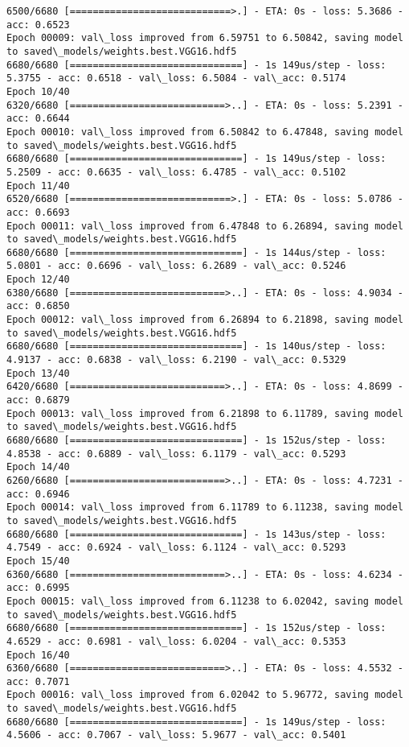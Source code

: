 \documentclass[11pt]{article}
\begin{document}
\begin{Verbatim}[commandchars=\\\{\}]
6500/6680 [============================>.] - ETA: 0s - loss: 5.3686 - acc: 0.6523
Epoch 00009: val\_loss improved from 6.59751 to 6.50842, saving model to saved\_models/weights.best.VGG16.hdf5
6680/6680 [==============================] - 1s 149us/step - loss: 5.3755 - acc: 0.6518 - val\_loss: 6.5084 - val\_acc: 0.5174
Epoch 10/40
6320/6680 [===========================>..] - ETA: 0s - loss: 5.2391 - acc: 0.6644
Epoch 00010: val\_loss improved from 6.50842 to 6.47848, saving model to saved\_models/weights.best.VGG16.hdf5
6680/6680 [==============================] - 1s 149us/step - loss: 5.2509 - acc: 0.6635 - val\_loss: 6.4785 - val\_acc: 0.5102
Epoch 11/40
6520/6680 [============================>.] - ETA: 0s - loss: 5.0786 - acc: 0.6693
Epoch 00011: val\_loss improved from 6.47848 to 6.26894, saving model to saved\_models/weights.best.VGG16.hdf5
6680/6680 [==============================] - 1s 144us/step - loss: 5.0801 - acc: 0.6696 - val\_loss: 6.2689 - val\_acc: 0.5246
Epoch 12/40
6380/6680 [===========================>..] - ETA: 0s - loss: 4.9034 - acc: 0.6850
Epoch 00012: val\_loss improved from 6.26894 to 6.21898, saving model to saved\_models/weights.best.VGG16.hdf5
6680/6680 [==============================] - 1s 140us/step - loss: 4.9137 - acc: 0.6838 - val\_loss: 6.2190 - val\_acc: 0.5329
Epoch 13/40
6420/6680 [===========================>..] - ETA: 0s - loss: 4.8699 - acc: 0.6879
Epoch 00013: val\_loss improved from 6.21898 to 6.11789, saving model to saved\_models/weights.best.VGG16.hdf5
6680/6680 [==============================] - 1s 152us/step - loss: 4.8538 - acc: 0.6889 - val\_loss: 6.1179 - val\_acc: 0.5293
Epoch 14/40
6260/6680 [===========================>..] - ETA: 0s - loss: 4.7231 - acc: 0.6946
Epoch 00014: val\_loss improved from 6.11789 to 6.11238, saving model to saved\_models/weights.best.VGG16.hdf5
6680/6680 [==============================] - 1s 143us/step - loss: 4.7549 - acc: 0.6924 - val\_loss: 6.1124 - val\_acc: 0.5293
Epoch 15/40
6360/6680 [===========================>..] - ETA: 0s - loss: 4.6234 - acc: 0.6995
Epoch 00015: val\_loss improved from 6.11238 to 6.02042, saving model to saved\_models/weights.best.VGG16.hdf5
6680/6680 [==============================] - 1s 152us/step - loss: 4.6529 - acc: 0.6981 - val\_loss: 6.0204 - val\_acc: 0.5353
Epoch 16/40
6360/6680 [===========================>..] - ETA: 0s - loss: 4.5532 - acc: 0.7071
Epoch 00016: val\_loss improved from 6.02042 to 5.96772, saving model to saved\_models/weights.best.VGG16.hdf5
6680/6680 [==============================] - 1s 149us/step - loss: 4.5606 - acc: 0.7067 - val\_loss: 5.9677 - val\_acc: 0.5401

\end{Verbatim}
\end{document}
